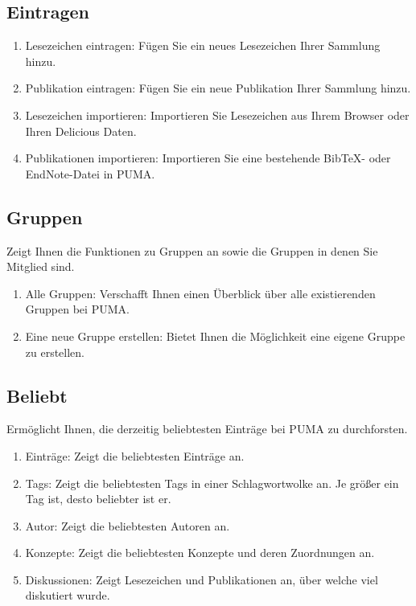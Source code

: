 \subsection{Eintragen}
\begin{enumerate}
    \item Lesezeichen eintragen: Fügen Sie ein neues Lesezeichen Ihrer Sammlung hinzu.  
    \item Publikation eintragen: Fügen Sie ein neue Publikation Ihrer Sammlung hinzu. 
    \item Lesezeichen importieren: Importieren Sie Lesezeichen aus Ihrem Browser oder Ihren Delicious Daten.
    \item Publikationen importieren: Importieren Sie eine bestehende BibTeX- oder EndNote-Datei in PUMA.
\end{enumerate}


\subsection{Gruppen}
Zeigt Ihnen die Funktionen zu Gruppen an sowie die Gruppen in denen Sie Mitglied sind.
\begin{enumerate}
    \item Alle Gruppen: Verschafft Ihnen einen Überblick über alle existierenden Gruppen bei PUMA.
    \item Eine neue Gruppe erstellen: Bietet Ihnen die Möglichkeit eine eigene Gruppe zu erstellen.
\end{enumerate}
\subsection{Beliebt}
Ermöglicht Ihnen, die derzeitig beliebtesten Einträge bei PUMA zu durchforsten.
\begin{enumerate}
    \item Einträge: Zeigt die beliebtesten Einträge an.
    \item Tags: Zeigt die beliebtesten Tags in einer Schlagwortwolke an. Je größer ein Tag ist, desto beliebter ist er.
    \item Autor: Zeigt die beliebtesten Autoren an.
    \item Konzepte: Zeigt die beliebtesten Konzepte und deren Zuordnungen an. 
    \item Diskussionen: Zeigt Lesezeichen und Publikationen an, über welche viel diskutiert wurde. 
\end{enumerate}
